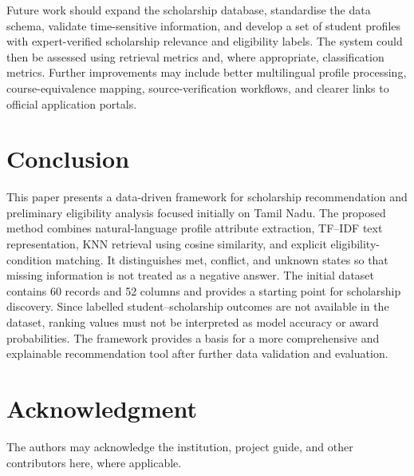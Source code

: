 \documentclass[conference]{IEEEtran}
\begin{document}
Future work should expand the scholarship database, standardise the data schema, validate time-sensitive information, and develop a set of student profiles with expert-verified scholarship relevance and eligibility labels. The system could then be assessed using retrieval metrics and, where appropriate, classification metrics. Further improvements may include better multilingual profile processing, course-equivalence mapping, source-verification workflows, and clearer links to official application portals.

\section{Conclusion}
This paper presents a data-driven framework for scholarship recommendation and preliminary eligibility analysis focused initially on Tamil Nadu. The proposed method combines natural-language profile attribute extraction, TF--IDF text representation, KNN retrieval using cosine similarity, and explicit eligibility-condition matching. It distinguishes met, conflict, and unknown states so that missing information is not treated as a negative answer. The initial dataset contains 60 records and 52 columns and provides a starting point for scholarship discovery. Since labelled student--scholarship outcomes are not available in the dataset, ranking values must not be interpreted as model accuracy or award probabilities. The framework provides a basis for a more comprehensive and explainable recommendation tool after further data validation and evaluation.

\section*{Acknowledgment}
The authors may acknowledge the institution, project guide, and other contributors here, where applicable.
\end{document}
